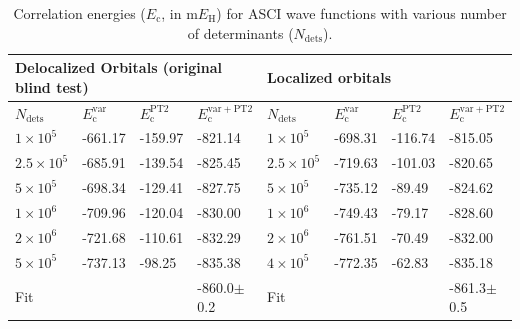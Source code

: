 \documentclass[journal=jcp,manuscript=suppinfo]{achemso}
\begin{document}
\begin{table}[]
	\begin{tabular}{llll|llll}
		\multicolumn{4}{l}{Delocalized Orbitals (original blind test)} & \multicolumn{4}{l}{Localized orbitals}             \\\hline
		$N_\text{dets}$      & $E_{\mathrm{c}}^{\mathrm{var}}$    & $E_{\mathrm{c}}^{\mathrm{PT2}}$      & $E_{\mathrm{c}}^{\mathrm{var+PT2}}$    & $N_\text{dets}$    & $E_{\mathrm{c}}^{\mathrm{var}}$ & $E_{\mathrm{c}}^{\mathrm{PT2}}$   & $E_{\mathrm{c}}^{\mathrm{var+PT2}}$ \\
		$1\times10^5$  & -661.17        & -159.97    & -821.14            & $1\times10^5$ & -698.31     & -116.74 & -815.05         \\
		$2.5\times10^5$    & -685.91        & -139.54    & -825.45            & $2.5\times10^5$ & -719.63     & -101.03 & -820.65         \\
		$5\times10^5$    & -698.34        & -129.41    & -827.75            & $5\times10^5$ & -735.12     & -89.49  & -824.62         \\
		$1\times10^6$    & -709.96        & -120.04    & -830.00            & $1\times10^6$ & -749.43     & -79.17  & -828.60         \\
		$2\times10^6$    & -721.68        & -110.61    & -832.29            & $2\times10^6$ & -761.51     & -70.49  & -832.00         \\
		$5\times10^5$    & -737.13        & -98.25     & -835.38            & $4\times10^5$ & -772.35     & -62.83  & -835.18         \\\hline 
		Fit         &                &            & -860.0$\pm$0.2            & Fit      &             &         & -861.3$\pm$0.5       
	\end{tabular}
	\caption{Correlation energies  ($E_{\mathrm{c}}$, in m$E_{\text{H}}$) for ASCI wave functions with various number of determinants ($N_\text{dets}$).}
	\label{tab:ascidata}
\end{table}


\end{document}
